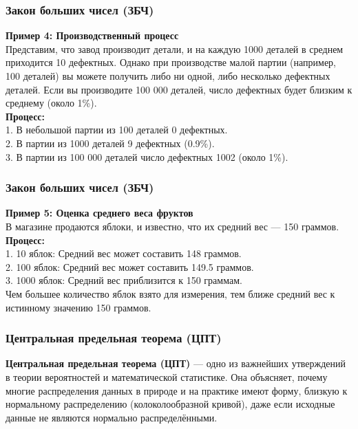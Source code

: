 \documentclass[aspectratio=169]{beamer}
\begin{document}
\begin{frame}
\frametitle{Закон больших чисел (ЗБЧ)}
{\bf Пример 4: Производственный процесс}\\
Представим, что завод производит детали, и на каждую 1000 деталей в среднем приходится 10 дефектных. Однако при производстве малой партии (например, 100 деталей) вы можете получить либо ни одной, либо несколько дефектных деталей. Если вы производите 100 000 деталей, число дефектных будет близким к среднему (около 1\%).
\newline\\
{\bf Процесс:}\\
1. В небольшой партии из 100 деталей 0 дефектных.\\
2. В партии из 1000 деталей 9 дефектных (0.9\%).\\
3. В партии из 100 000 деталей число дефектных 1002 (около 1\%).
\end{frame}

\begin{frame}
\frametitle{Закон больших чисел (ЗБЧ)}
{\bf Пример 5: Оценка среднего веса фруктов}\\
В магазине продаются яблоки, и известно, что их средний вес — 150 граммов.
\newline\\
{\bf Процесс:}\\
1. 10 яблок: Средний вес может составить 148 граммов.\\
2. 100 яблок: Средний вес может составить 149.5 граммов.\\
3. 1000 яблок: Средний вес приблизится к 150 граммам.
\newline\\
Чем большее количество яблок взято для измерения, тем ближе средний вес к истинному значению 150 граммов.
\end{frame}

\begin{frame}
\frametitle{Центральная предельная теорема (ЦПТ)}
{\bf Центральная предельная теорема (ЦПТ)} — одно из важнейших утверждений в теории вероятностей и математической статистике. Она объясняет, почему многие распределения данных в природе и на практике имеют форму, близкую к нормальному распределению (колоколообразной кривой), даже если исходные данные не являются нормально распределёнными.
\end{frame}
\end{document}
